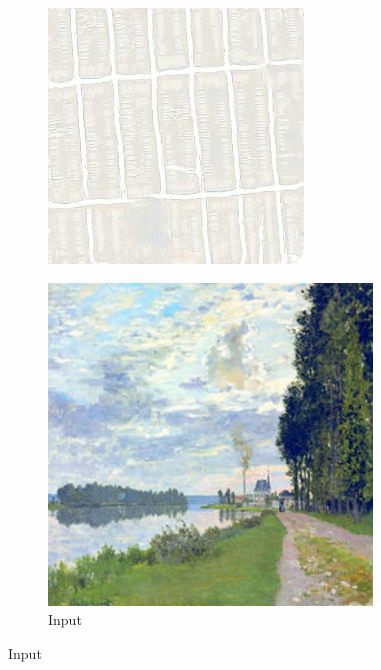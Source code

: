 \begin{figure}
\begin{subfigure}[t]{.14\textwidth}
    \includegraphics[width=\linewidth]{images/cycleGanResults/Maps10_Ld120_E100_Lr0002.jpg}
  \end{subfigure}
  \hfill
  \begin{subfigure}[t]{.14\textwidth}
    \caption*{Input}
    \centering
    \includegraphics[width=\linewidth]{images/cycleGanResults/monet_input1.png}

\end{subfigure}
\end{figure}
